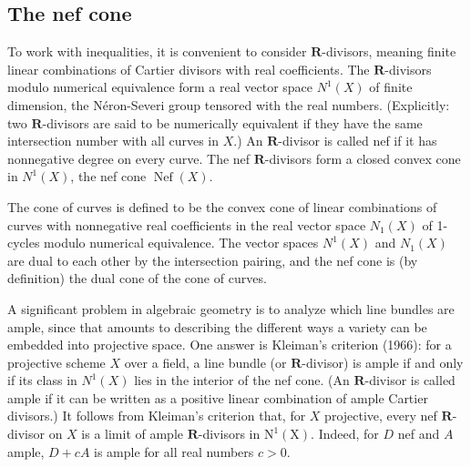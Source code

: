 \documentclass[twoside,openany,12pt]{beautynote}
\begin{document}
\subsection{The nef cone}

To work with inequalities, it is convenient to consider $\mathbf{R}$-divisors, meaning finite linear combinations of Cartier divisors with real coefficients. The $\mathbf{R}$-divisors modulo numerical equivalence form a real vector space $N^1(X)$ of finite dimension, the Néron-Severi group tensored with the real numbers.  (Explicitly: two $\mathbf{R}$-divisors are said to be numerically equivalent if they have the same intersection number with all curves in $X$.) An $\mathbf{R}$-divisor is called nef if it has nonnegative degree on every curve. The nef $\mathbf{R}$-divisors form a closed convex cone in $N^1(X)$, the nef cone $\operatorname{Nef}(X)$.

The cone of curves is defined to be the convex cone of linear combinations of curves with nonnegative real coefficients in the real vector space $N_1(X)$ of 1-cycles modulo numerical equivalence. The vector spaces $N^1(X)$ and $N_1(X)$ are dual to each other by the intersection pairing, and the nef cone is (by definition) the dual cone of the cone of curves.

A significant problem in algebraic geometry is to analyze which line bundles are ample, since that amounts to describing the different ways a variety can be embedded into projective space. One answer is Kleiman's criterion (1966): for a projective scheme $X$ over a field, a line bundle (or $\mathbf{R}$-divisor) is ample if and only if its class in $N^1(X)$ lies in the interior of the nef cone.  (An $\mathbf{R}$-divisor is called ample if it can be written as a positive linear combination of ample Cartier divisors.) It follows from Kleiman's criterion that, for $X$ projective, every nef $\mathbf{R}$-divisor on $X$ is a limit of ample $\mathbf{R}$-divisors in $\mathrm{N}^1(\mathrm{X})$. Indeed, for $D$ nef and $A$ ample, $D+c A$ is ample for all real numbers $c>0$.
\end{document}
